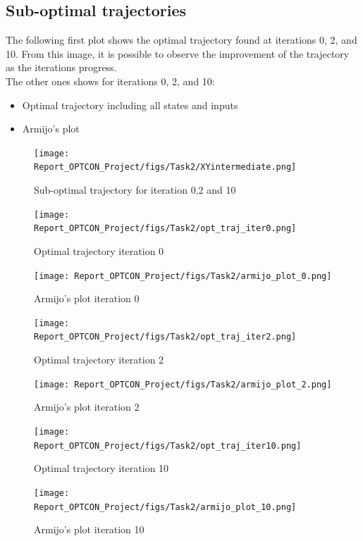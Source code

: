 \documentclass[a4paper,11pt,oneside]{book}
\begin{document}
\subsection{Sub-optimal trajectories}
The following first plot shows the optimal trajectory found at iterations 0, 2, and 10. From this image, it is possible to observe the improvement of the trajectory as the iterations progress.\\

The other ones shows for iterations 0, 2, and 10:
\begin{itemize}
    \item Optimal trajectory including all states and inputs
    \item Armijo's plot
\end{itemize}
\begin{figure}[h]
    \centering
    \texttt{[image: Report\_OPTCON\_Project/figs/Task2/XYintermediate.png]} \\
    \caption{Sub-optimal trajectory for iteration 0,2 and 10}
    \label{fig:sub-opt}
\end{figure}

\begin{figure}[t]
    \centering
    \texttt{[image: Report\_OPTCON\_Project/figs/Task2/opt\_traj\_iter0.png]} \\
    \caption{Optimal trajectory iteration 0}
    \label{fig:optimal0}
\end{figure}
\begin{figure}[h]
    \centering
    \texttt{[image: Report\_OPTCON\_Project/figs/Task2/armijo\_plot\_0.png]} \\
    \caption{Armijo's plot iteration 0}
    \label{fig:armijo0}
\end{figure}

\begin{figure}[t]
    \centering
    \texttt{[image: Report\_OPTCON\_Project/figs/Task2/opt\_traj\_iter2.png]} \\
    \caption{Optimal trajectory iteration 2}
    \label{fig:optimal2}
\end{figure}
\begin{figure}[h]
    \centering
    \texttt{[image: Report\_OPTCON\_Project/figs/Task2/armijo\_plot\_2.png]} \\
    \caption{Armijo's plot iteration 2}
    \label{fig:armijo2}
\end{figure}

\begin{figure}[t]
    \centering
    \texttt{[image: Report\_OPTCON\_Project/figs/Task2/opt\_traj\_iter10.png]} \\
    \caption{Optimal trajectory iteration 10}
    \label{fig:optimal10}
\end{figure}
\begin{figure}[h]
    \centering
    \texttt{[image: Report\_OPTCON\_Project/figs/Task2/armijo\_plot\_10.png]} \\
    \caption{Armijo's plot iteration 10}
    \label{fig:armijo10}
\end{figure}
\end{document}
